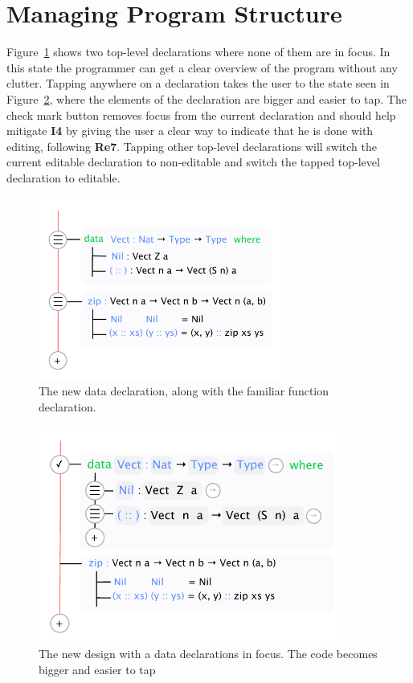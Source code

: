 \section{Managing Program Structure}
\label{subsec:managing_program_structure}
Figure~\ref{fig:new_data_declaration} shows two top-level declarations
where none of them are in focus. 
In this state the programmer can get a clear overview of the program without any clutter. 
Tapping anywhere on a declaration takes the user to the state seen in Figure~\ref{fig:new_design_data_in_focus}, where the elements of the declaration are bigger and easier to tap.
The check mark button removes focus from the current declaration and should help mitigate \textbf{I4} by giving the user a clear way to indicate that he is done with editing, following \textbf{Re7}.
Tapping other top-level declarations will switch the current editable declaration to non-editable and switch the tapped top-level declaration to editable.

\begin{figure}
	\centering
		\includegraphics[width=80mm]{diagrams/final_design_nothing_in_focus.pdf}
	\caption{The new data declaration, along with the familiar function declaration.}
\label{fig:new_data_declaration}
\end{figure}

\begin{figure}
	\centering
		\includegraphics[width=100mm]{diagrams/final_design_top_dec_in_focus.pdf}
	\caption{The new design with a data declarations in focus. The code becomes
	bigger and easier to tap}
\label{fig:new_design_data_in_focus}
\end{figure}

